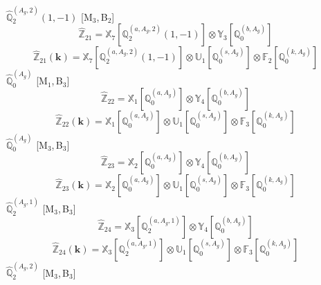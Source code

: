 \documentclass[fleqn,10pt,landscape]{article}
\begin{document}
\begin{itemize}
\noindent {} $\,\,\,\hat{\mathbb{Q}}_{2}^{(A_{g},2)}(1,-1)$ [M$_{3}$,\,B$_{2}$]
\begin{dmath*}
\hat{\mathbb{Z}}_{21}=\mathbb{X}_{7}[\mathbb{Q}_{2}^{(a,A_{g},2)}(1,-1)] \otimes\mathbb{Y}_{3}[\mathbb{Q}_{0}^{(b,A_{g})}]
\end{dmath*}
\begin{dmath*}
\hat{\mathbb{Z}}_{21}(\bm{k})=\mathbb{X}_{7}[\mathbb{Q}_{2}^{(a,A_{g},2)}(1,-1)] \otimes\mathbb{U}_{1}[\mathbb{Q}_{0}^{(s,A_{g})}] \otimes\mathbb{F}_{2}[\mathbb{Q}_{0}^{(k,A_{g})}]
\end{dmath*}
\vspace{4mm}
\noindent {} $\,\,\,\hat{\mathbb{Q}}_{0}^{(A_{g})}$ [M$_{1}$,\,B$_{3}$]
\begin{dmath*}
\hat{\mathbb{Z}}_{22}=\mathbb{X}_{1}[\mathbb{Q}_{0}^{(a,A_{g})}] \otimes\mathbb{Y}_{4}[\mathbb{Q}_{0}^{(b,A_{g})}]
\end{dmath*}
\begin{dmath*}
\hat{\mathbb{Z}}_{22}(\bm{k})=\mathbb{X}_{1}[\mathbb{Q}_{0}^{(a,A_{g})}] \otimes\mathbb{U}_{1}[\mathbb{Q}_{0}^{(s,A_{g})}] \otimes\mathbb{F}_{3}[\mathbb{Q}_{0}^{(k,A_{g})}]
\end{dmath*}
\vspace{4mm}
\noindent {} $\,\,\,\hat{\mathbb{Q}}_{0}^{(A_{g})}$ [M$_{3}$,\,B$_{3}$]
\begin{dmath*}
\hat{\mathbb{Z}}_{23}=\mathbb{X}_{2}[\mathbb{Q}_{0}^{(a,A_{g})}] \otimes\mathbb{Y}_{4}[\mathbb{Q}_{0}^{(b,A_{g})}]
\end{dmath*}
\begin{dmath*}
\hat{\mathbb{Z}}_{23}(\bm{k})=\mathbb{X}_{2}[\mathbb{Q}_{0}^{(a,A_{g})}] \otimes\mathbb{U}_{1}[\mathbb{Q}_{0}^{(s,A_{g})}] \otimes\mathbb{F}_{3}[\mathbb{Q}_{0}^{(k,A_{g})}]
\end{dmath*}
\vspace{4mm}
\noindent {} $\,\,\,\hat{\mathbb{Q}}_{2}^{(A_{g},1)}$ [M$_{3}$,\,B$_{3}$]
\begin{dmath*}
\hat{\mathbb{Z}}_{24}=\mathbb{X}_{3}[\mathbb{Q}_{2}^{(a,A_{g},1)}] \otimes\mathbb{Y}_{4}[\mathbb{Q}_{0}^{(b,A_{g})}]
\end{dmath*}
\begin{dmath*}
\hat{\mathbb{Z}}_{24}(\bm{k})=\mathbb{X}_{3}[\mathbb{Q}_{2}^{(a,A_{g},1)}] \otimes\mathbb{U}_{1}[\mathbb{Q}_{0}^{(s,A_{g})}] \otimes\mathbb{F}_{3}[\mathbb{Q}_{0}^{(k,A_{g})}]
\end{dmath*}
\vspace{4mm}
\noindent {} $\,\,\,\hat{\mathbb{Q}}_{2}^{(A_{g},2)}$ [M$_{3}$,\,B$_{3}$]

\end{itemize}
\end{document}
